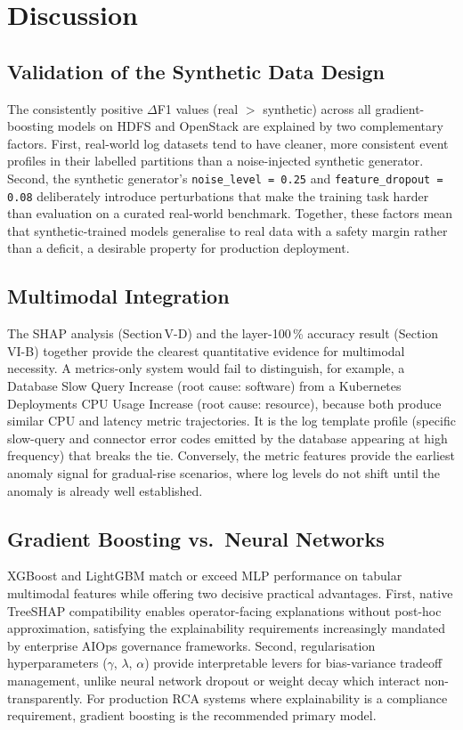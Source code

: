 \documentclass[5p, times]{elsarticle}
\begin{document}
\section{Discussion}\label{sec9}

\subsection{Validation of the Synthetic Data Design}
The consistently positive $\Delta$F1 values (real $>$ synthetic) across all gradient-boosting models on HDFS and OpenStack are explained by two complementary factors. First, real-world log
datasets tend to have cleaner, more consistent event profiles in their labelled partitions than a noise-injected synthetic generator. Second, the synthetic generator's \texttt{noise\_level\,=\,0.25}
and \texttt{feature\_dropout\,=\,0.08} deliberately introduce perturbations that make the training task harder than evaluation on a curated real-world benchmark. Together, these factors mean that
synthetic-trained models generalise to real data with a safety margin rather than a deficit, a desirable property for production deployment.

\subsection{Multimodal Integration}
The SHAP analysis (Section\,V-D) and the layer-100\,\% accuracy result (Section\,VI-B) together provide the clearest quantitative evidence for multimodal necessity. A metrics-only system would
fail to distinguish, for example, a Database Slow Query Increase (root cause: software) from a Kubernetes Deployments CPU Usage Increase (root cause: resource), because both produce similar CPU and latency metric trajectories.
It is the log template profile (specific slow-query and connector error codes emitted by the database appearing at high frequency) that breaks the tie. Conversely, the metric features provide the earliest anomaly
signal for gradual-rise scenarios, where log levels do not shift until the anomaly is already well established.

\subsection{Gradient Boosting vs.\ Neural Networks}
XGBoost and LightGBM match or exceed MLP performance on tabular multimodal features while offering two decisive practical advantages. First, native TreeSHAP compatibility enables operator-facing explanations without post-hoc approximation,
satisfying the explainability requirements increasingly mandated by enterprise AIOps governance frameworks. Second, regularisation hyperparameters ($\gamma$, $\lambda$, $\alpha$) provide
interpretable levers for bias-variance tradeoff management, unlike neural network dropout or weight decay which interact non-transparently. For production RCA systems where explainability is a compliance requirement, gradient boosting is the recommended primary model.
\end{document}
